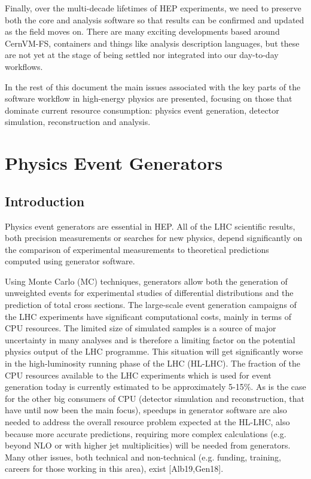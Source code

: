 \documentclass[10pt,a4paper]{article}
\begin{document}
Finally, over the multi-decade lifetimes of HEP experiments, we need to
preserve both the core and analysis software so that results can be
confirmed and updated as the field moves on. There are many exciting
developments based around CernVM-FS, containers and things like analysis
description languages, but these are not yet at the stage of being
settled nor integrated into our day-to-day workflows.

In the rest of this document the main issues associated with the key
parts of the software workflow in high-energy physics are presented,
focusing on those that dominate current resource consumption: physics
event generation, detector simulation, reconstruction and analysis.

\hypertarget{physics-event-generators}{%
\section{Physics Event Generators}\label{physics-event-generators}}

\hypertarget{introduction-1}{%
\subsection{Introduction}\label{introduction-1}}

Physics event generators are essential in HEP. All of the LHC scientific
results, both precision measurements or searches for new physics, depend
significantly on the comparison of experimental measurements to
theoretical predictions computed using generator software.

Using Monte Carlo (MC) techniques, generators allow both the generation
of unweighted events for experimental studies of differential
distributions and the prediction of total cross sections. The
large-scale event generation campaigns of the LHC experiments have
significant computational costs, mainly in terms of CPU resources. The
limited size of simulated samples is a source of major uncertainty in
many analyses and is therefore a limiting factor on the potential
physics output of the LHC programme. This situation will get
significantly worse in the high-luminosity running phase of the LHC
(HL-LHC). The fraction of the CPU resources available to the LHC
experiments which is used for event generation today is currently
estimated to be approximately 5-15\%. As is the case for the other big
consumers of CPU (detector simulation and reconstruction, that have
until now been the main focus), speedups in generator software are also
needed to address the overall resource problem expected at the HL-LHC,
also because more accurate predictions, requiring more complex
calculations (e.g. beyond NLO or with higher jet multiplicities) will be
needed from generators. Many other issues, both technical and
non-technical (e.g. funding, training, careers for those working in this
area), exist {[}Alb19,Gen18{]}.
\end{document}

